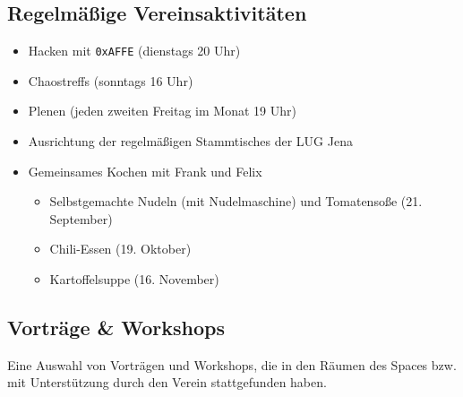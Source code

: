 \documentclass[10pt,DIV16]{scrartcl}
\begin{document}
\subsection{Regelmäßige Vereinsaktivitäten}

\begin{itemize}
	\item Hacken mit \texttt{0xAFFE} (dienstags 20 Uhr)
	\item Chaostreffs (sonntags 16 Uhr)
	\item Plenen (jeden zweiten Freitag im Monat 19 Uhr)
	\item Ausrichtung der regelmäßigen Stammtisches der LUG Jena
	\item Gemeinsames Kochen mit Frank und Felix
		\begin{itemize}
			\item Selbstgemachte Nudeln (mit Nudelmaschine) und
				Tomatensoße (21. September)
			\item Chili-Essen (19. Oktober)
			\item Kartoffelsuppe (16. November)
		\end{itemize}
\end{itemize}

\subsection{Vorträge \& Workshops}

Eine Auswahl von Vorträgen und Workshops, die in den Räumen des
Spaces bzw. mit Unterstützung durch den Verein stattgefunden haben.
\end{document}
